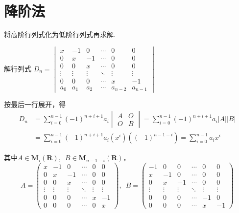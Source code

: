 \section{降阶法}

将高阶行列式化为低阶行列式再求解.

\begin{example}
    解行列式
    $D_n=\begin{vmatrix}
        x & -1 & 0 & \cdots & 0 & 0 \\
        0 & x & -1 & \cdots & 0 & 0 \\
        0 & 0 & x & \cdots & 0 & 0 \\
        \vdots & \vdots & \vdots & \ddots & \vdots & \vdots \\
        0 & 0 & 0 & \cdots & x & -1 \\
        a_{0} & a_{1} & a_{2} &\cdots &a_{n-2}&a_{n-1}
    \end{vmatrix}$
\end{example}

\begin{solution}
    按最后一行展开，得
    \begin{align*}
        D_n&=\sum_{i=0}^{n-1}(-1)^{n+i+1}a_i\begin{vmatrix} A & O \\ O & B \end{vmatrix}
            =\sum_{i=0}^{n-1}(-1)^{n+i+1}a_i|A||B|\\
           &=\sum_{i=0}^{n-1}(-1)^{n+i+1}a_i(x^i)\left((-1)^{n-1-i}\right)
            =\sum_{i=0}^{n-1}a_i x^i
    \end{align*}

    其中$A\in \mathbf{M}_i(\mathbf{R}),\enspace B\in \mathbf{M}_{n-1-i}(\mathbf{R})$，
    \[ A=\begin{pmatrix}
        x & -1 & 0 & \cdots & 0 &0\\
        0 & x & -1 & \cdots & 0&0\\
        0 & 0 & x & \cdots & 0&0\\
        \vdots & \vdots & \vdots & \ddots & \vdots & \vdots\\
        0 & 0 & 0 & \cdots &x & -1\\
        0 & 0 & 0 & \cdots &0 & x
    \end{pmatrix},\enspace
    B=\begin{pmatrix}
        -1 & 0 & 0 & \cdots & 0 &0\\
        x & -1 & 0 & \cdots & 0 &0\\
        0 & x & -1 & \cdots & 0 &0\\
        \vdots & \vdots & \vdots & \ddots & \vdots & \vdots \\
        0 & 0 & 0 & \cdots &-1 & 0\\
        0 & 0 & 0 & \cdots &x & -1
    \end{pmatrix} \]
\end{solution}

